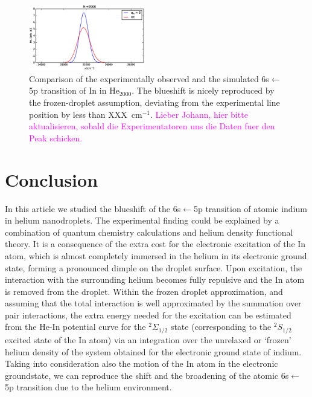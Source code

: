 \documentclass[twoside,twocolumn,9pt]{article}
\def\hl#1{\textcolor{magenta}{#1}}  %
\begin{document}
\begin{figure}[htbp!]
  	\begin{center}
 		\includegraphics[width=0.45\textwidth]{7.eps}
                \caption{Comparison of the experimentally observed and the simulated 6s$\leftarrow{}$5p transition of In in He$_{2000}$. The blueshift is nicely reproduced by the frozen-droplet assumption, deviating from the experimental line position by less than XXX~cm$^{-1}$. \hl{Lieber Johann, hier bitte aktualisieren, sobald die Experimentatoren uns die Daten fuer den Peak schicken.} \label{pic:final}}
  	\end{center}
\end{figure}

\section{Conclusion}
In this article we studied the blueshift of the 6s$\leftarrow{}$5p transition of atomic indium in helium nanodroplets. The experimental finding could be explained by a combination of quantum chemistry calculations and helium density functional theory. It is a consequence of the extra cost for the electronic excitation of the In atom, which is almost completely immersed in the helium in its electronic ground state, forming a pronounced dimple on the droplet surface. Upon excitation, the interaction with the surrounding helium becomes fully repulsive and the In atom is removed from the droplet. Within the frozen droplet approximation, and assuming that the total interaction is well approximated by the summation over pair interactions, the extra energy needed for the excitation can be estimated from the He-In potential curve for the  $^2\Sigma_{1/2}$ state (corresponding to the $^2S_{1/2}$ excited state of the In atom) via an integration over the unrelaxed or `frozen' helium density of the system obtained for the electronic ground state of indium. Taking into consideration also the motion of the In atom in the electronic groundstate, we can reproduce the shift and the broadening of the atomic 6s$\leftarrow{}$5p transition due to the helium environment.


\end{document}

